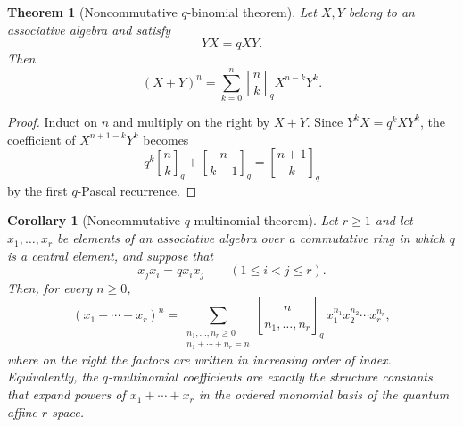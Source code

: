 \documentclass[11pt,oneside,openany]{book}
\newtheorem{theorem}{Theorem}[chapter]
\newtheorem{corollary}[corollary]{Corollary}
\theoremstyle{definition}
\theoremstyle{remark}
\newcommand{\qbinom}[2]{\genfrac{[}{]}{0pt}{}{#1}{#2}_{q}}
\newcommand{\qmultinom}[2]{\genfrac{[}{]}{0pt}{}{#1}{#2}_{q}}
\begin{document}
\begin{theorem}[Noncommutative $q$-binomial theorem]\label{thm:quantum-binomial}
Let $X,Y$ belong to an associative algebra and satisfy
\[
 YX=qXY.
\]
Then
\[
 (X+Y)^n=\sum_{k=0}^{n}\qbinom nkX^{n-k}Y^k.
\]
\end{theorem}

\begin{proof}
Induct on $n$ and multiply on the right by $X+Y$.  Since $Y^kX=q^kXY^k$, the coefficient of $X^{n+1-k}Y^k$ becomes
\[
 q^k\qbinom nk+\qbinom n{k-1}=\qbinom{n+1}k
\]
by the first $q$-Pascal recurrence.
\end{proof}


\begin{corollary}[Noncommutative $q$-multinomial theorem]\label{cor:quantum-multinomial}
Let $r\ge1$ and let $x_1,\dots,x_r$ be elements of an associative algebra over a commutative ring in which $q$ is a central element, and suppose that
\[
 x_jx_i=qx_ix_j
 \qquad(1\le i<j\le r).
\]
Then, for every $n\ge0$,
\[
 (x_1+\cdots+x_r)^n
 =\sum_{\substack{n_1,\dots,n_r\ge0\\ n_1+\cdots+n_r=n}}
 \qmultinom{n}{n_1,\dots,n_r}\,
 x_1^{n_1}x_2^{n_2}\cdots x_r^{n_r},
\]
where on the right the factors are written in increasing order of index.  Equivalently, the $q$-multinomial coefficients are exactly the structure constants that expand powers of $x_1+\cdots+x_r$ in the ordered monomial basis of the quantum affine $r$-space.
\end{corollary}

\end{document}
